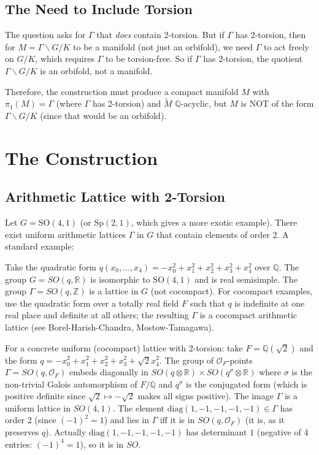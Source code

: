 \documentclass[12pt]{article}
\theoremstyle{definition}
\begin{document}
\subsection{The Need to Include Torsion}

The question asks for $\Gamma$ that \emph{does} contain 2-torsion. But if $\Gamma$ has 2-torsion, then for $M = \Gamma\backslash G/K$ to be a manifold (not just an orbifold), we need $\Gamma$ to act freely on $G/K$, which requires $\Gamma$ to be torsion-free. So if $\Gamma$ has 2-torsion, the quotient $\Gamma\backslash G/K$ is an orbifold, not a manifold.

Therefore, the construction must produce a compact manifold $M$ with $\pi_1(M) = \Gamma$ (where $\Gamma$ has 2-torsion) and $\tilde{M}$ $\mathbb{Q}$-acyclic, but $M$ is NOT of the form $\Gamma\backslash G/K$ (since that would be an orbifold).

\section{The Construction}

\subsection{Arithmetic Lattice with 2-Torsion}

Let $G = \mathrm{SO}(4,1)$ (or $\mathrm{Sp}(2,1)$, which gives a more exotic example). There exist uniform arithmetic lattices $\Gamma$ in $G$ that contain elements of order 2. A standard example:

Take the quadratic form $q(x_0,\ldots,x_4) = -x_0^2 + x_1^2+x_2^2+x_3^2+x_4^2$ over $\mathbb{Q}$. The group $G = SO(q,\mathbb{R})$ is isomorphic to $\mathrm{SO}(4,1)$ and is real semisimple. The group $\Gamma = SO(q,\mathbb{Z})$ is a lattice in $G$ (not cocompact). For cocompact examples, use the quadratic form over a totally real field $F$ such that $q$ is indefinite at one real place and definite at all others; the resulting $\Gamma$ is a cocompact arithmetic lattice (see Borel-Harish-Chandra, Mostow-Tamagawa).

For a concrete uniform (cocompact) lattice with 2-torsion: take $F = \mathbb{Q}(\sqrt{2})$ and the form $q = -x_0^2+x_1^2+x_2^2+x_3^2+\sqrt{2}x_4^2$. The group of $\mathcal{O}_F$-points $\Gamma = SO(q,\mathcal{O}_F)$ embeds diagonally in $SO(q\otimes\mathbb{R})\times SO(q^\sigma\otimes\mathbb{R})$ where $\sigma$ is the non-trivial Galois automorphism of $F/\mathbb{Q}$ and $q^\sigma$ is the conjugated form (which is positive definite since $\sqrt{2}\mapsto -\sqrt{2}$ makes all signs positive). The image $\Gamma$ is a uniform lattice in $SO(4,1)$. The element $\mathrm{diag}(1,-1,-1,-1,-1)\in\Gamma$ has order 2 (since $(-1)^2 = 1$) and lies in $\Gamma$ iff it is in $SO(q,\mathcal{O}_F)$ (it is, as it preserves $q$). Actually $\mathrm{diag}(1,-1,-1,-1,-1)$ has determinant $1$ (negative of 4 entries: $(-1)^4 = 1$), so it is in $SO$.
\end{document}

